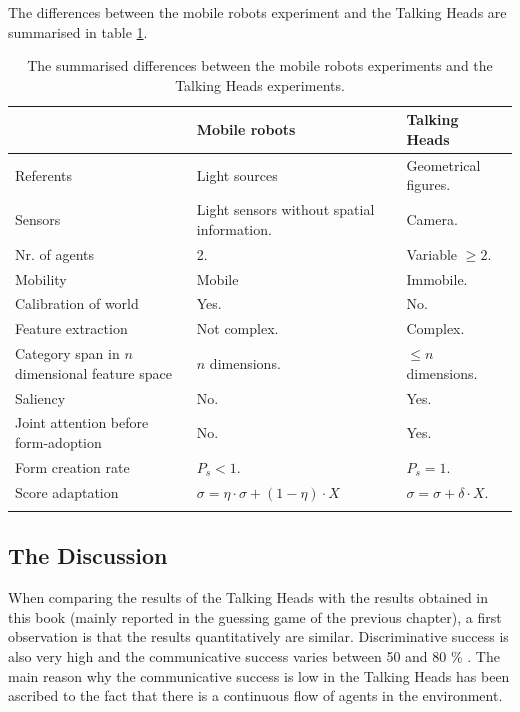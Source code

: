 The differences between the mobile robots experiment and the Talking Heads are summarised in table \ref{t:disc:differences}.

\begin{table}
\centering
\begin{tabular}{p{3cm}p{4cm}l}
\lsptoprule
 & {\sc Mobile robots} & {\sc Talking Heads}\\\midrule
Referents & Light sources & Geometrical figures.\\\hline
Sensors & Light sensors without spatial information. & Camera.\\\hline
Nr. of agents & 2. & Variable $\geq 2$.\\\hline
Mobility & Mobile & Immobile.\\\hline
Calibration of world & Yes. & No.\\\hline
Feature extraction & Not complex. & Complex.\\\hline
Category span in $n$ dimensional feature space & $n$ dimensions. & $\leq n$ dimensions.\\\hline
Saliency & No. & Yes.\\\hline
Joint attention before form-adoption & No. & Yes.\\\hline
Form creation rate & $P_s<1$. & $P_s=1$.\\\hline
Score adaptation & $\sigma = \eta \cdot \sigma + (1-\eta) \cdot X$ & $\sigma = \sigma + \delta \cdot X$.\\%
\lspbottomrule
\end{tabular}
\caption{The summarised differences between the mobile robots experiments and the Talking Heads experiments.}
\label{t:disc:differences}
\end{table}


\subsection{The Discussion}

When comparing the results of the Talking Heads \citep{steels:2000,kaplan:2000} with the results obtained in this book (mainly reported in the guessing game of the previous chapter), a first observation is that the results quantitatively are similar. Discriminative success is also very high \citep{steels:2000} and the communicative success varies between 50 and 80 \% \citep{kaplan:2000}. The main reason why the communicative success is low in the Talking Heads has been ascribed to the fact that there is a continuous flow of agents in the environment.

